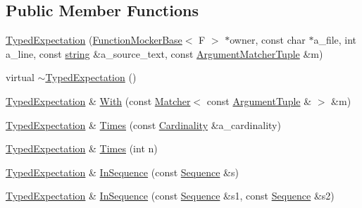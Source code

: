 \subsection*{Public Member Functions}
\begin{DoxyCompactItemize}
\item 
\hyperlink{classtesting_1_1internal_1_1_typed_expectation_a10bd0a8fa0db37215be42e1c61ccbc28}{Typed\+Expectation} (\hyperlink{classtesting_1_1internal_1_1_function_mocker_base}{Function\+Mocker\+Base}$<$ F $>$ $\ast$owner, const char $\ast$a\+\_\+file, int a\+\_\+line, const \hyperlink{namespacetesting_1_1internal_a8e8ff5b11e64078831112677156cb111}{string} \&a\+\_\+source\+\_\+text, const \hyperlink{classtesting_1_1internal_1_1_typed_expectation_a8f10e3906761cc5c10fa3561c6e8938e}{Argument\+Matcher\+Tuple} \&m)
\item 
virtual \hyperlink{classtesting_1_1internal_1_1_typed_expectation_a4d73d7edd81f1b1418a33931fe728158}{$\sim$\+Typed\+Expectation} ()
\item 
\hyperlink{classtesting_1_1internal_1_1_typed_expectation}{Typed\+Expectation} \& \hyperlink{classtesting_1_1internal_1_1_typed_expectation_a4b25ec3d051e8551f3e213214b31c714}{With} (const \hyperlink{classtesting_1_1_matcher}{Matcher}$<$ const \hyperlink{classtesting_1_1internal_1_1_typed_expectation_a9a91379262d101f435809ba4556d14fa}{Argument\+Tuple} \& $>$ \&m)
\item 
\hyperlink{classtesting_1_1internal_1_1_typed_expectation}{Typed\+Expectation} \& \hyperlink{classtesting_1_1internal_1_1_typed_expectation_a9a4c34ee5c6e6adc880a22f61f33da57}{Times} (const \hyperlink{classtesting_1_1_cardinality}{Cardinality} \&a\+\_\+cardinality)
\item 
\hyperlink{classtesting_1_1internal_1_1_typed_expectation}{Typed\+Expectation} \& \hyperlink{classtesting_1_1internal_1_1_typed_expectation_a92d56ee785d38ec8193aed2a0fcbccf0}{Times} (int n)
\item 
\hyperlink{classtesting_1_1internal_1_1_typed_expectation}{Typed\+Expectation} \& \hyperlink{classtesting_1_1internal_1_1_typed_expectation_ada9e9081a98435991310ac60483d1230}{In\+Sequence} (const \hyperlink{classtesting_1_1_sequence}{Sequence} \&s)
\item 
\hyperlink{classtesting_1_1internal_1_1_typed_expectation}{Typed\+Expectation} \& \hyperlink{classtesting_1_1internal_1_1_typed_expectation_ac0f45c73e3f816796f6c5dea2dc70131}{In\+Sequence} (const \hyperlink{classtesting_1_1_sequence}{Sequence} \&s1, const \hyperlink{classtesting_1_1_sequence}{Sequence} \&s2)

\end{DoxyCompactItemize}
